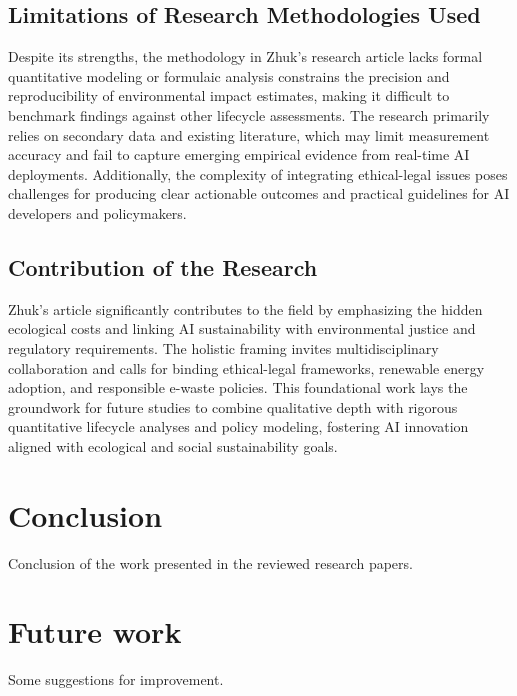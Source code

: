 \documentclass[a4paper, 12pt]{article}
\begin{document}
\subsection{Limitations of Research Methodologies Used}
\hspace{24pt} Despite its strengths, the methodology in Zhuk's research article lacks formal quantitative modeling or formulaic analysis constrains the precision and reproducibility of environmental impact estimates, making it difficult to benchmark findings against other lifecycle assessments. The research primarily relies on secondary data and existing literature, which may limit measurement accuracy and fail to capture emerging empirical evidence from real-time AI deployments. Additionally, the complexity of integrating ethical-legal issues poses challenges for producing clear actionable outcomes and practical guidelines for AI developers and policymakers.

\subsection{Contribution of the Research}
\hspace{24pt} Zhuk's article significantly contributes to the field by emphasizing the hidden ecological costs and linking AI sustainability with environmental justice and regulatory requirements. The holistic framing invites multidisciplinary collaboration and calls for binding ethical-legal frameworks, renewable energy adoption, and responsible e-waste policies. This foundational work lays the groundwork for future studies to combine qualitative depth with rigorous quantitative lifecycle analyses and policy modeling, fostering AI innovation aligned with ecological and social sustainability goals.

\section{Conclusion}
Conclusion of the work presented in the reviewed research papers.

\section{Future work}
Some suggestions for improvement.


{}
\end{document}
